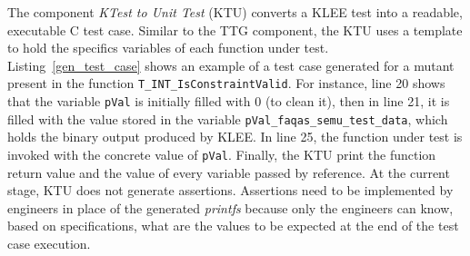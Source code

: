 The component \emph{KTest to Unit Test} (KTU) converts a KLEE test into a readable, executable C test case. Similar to the TTG component, the KTU uses a template to hold the specifics variables of each function under test. 
Listing~\ref{gen_test_case} shows an example of a test case generated for a mutant present in the function \texttt{T\_INT\_IsConstraintValid}. For instance, line 20 shows that the variable \texttt{pVal} is initially filled with 0 (to clean it), then in line 21, it is filled with the value stored in the variable \texttt{pVal\_faqas\_semu\_test\_data}, which holds the binary output produced by KLEE. In line 25, the function under test is invoked with the concrete value of \texttt{pVal}. Finally, the KTU print the function return value and the value of every variable passed by reference.
At the current stage, KTU does not generate assertions. Assertions need to be implemented by engineers in place of the generated \emph{printfs} because only the engineers can know, based on specifications, what are the values to be expected at the end of the test case execution.


\ENDCHANGEDWPT
